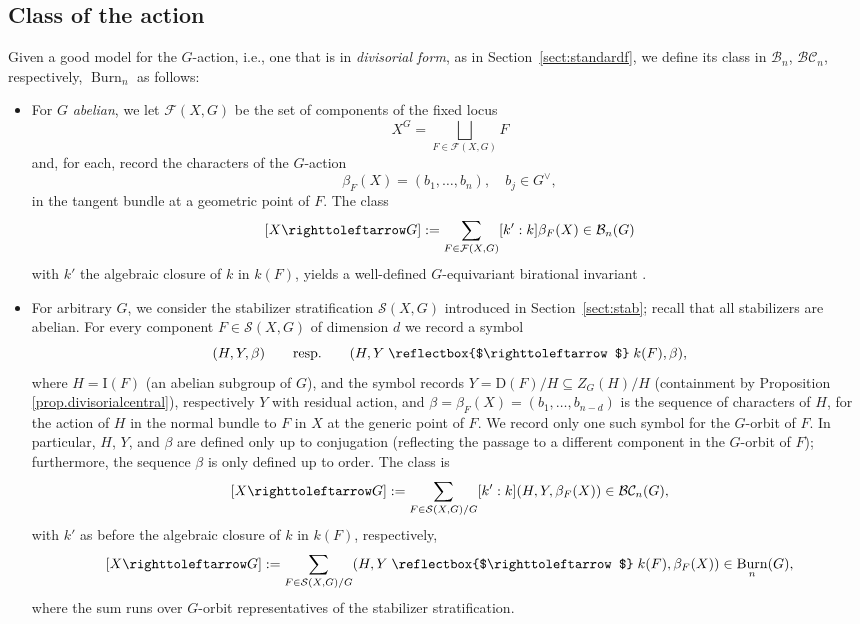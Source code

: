 \documentclass[12pt,reqno]{amsart}
\theoremstyle{plain}
\theoremstyle{remark}
\theoremstyle{definition}
\numberwithin{equation}{section}
\newcommand{\cB}{{\mathcal B}}
\newcommand{\cF}{{\mathcal F}}
\newcommand{\cS}{{\mathcal S}}
\newcommand{\BC}{{\mathcal B}{\mathcal C}}
\newcommand{\actsfromleft}{\mathrel{\reflectbox{$\righttoleftarrow$}}}
\newcommand{\actsfromright}{\righttoleftarrow}
\DeclareMathOperator{\Burn}{Burn}
\begin{document}
\subsection{Class of the action} 
\label{sect:class}
Given a good model for the $G$-action, i.e., one that is in \emph{divisorial form}, as in Section~\ref{sect:standardf}, we define its class in $\cB_n$, $\BC_n$, respectively, $\Burn_n$ as follows: 
\begin{itemize}
\item For $G$ {\em abelian}, we let $\cF(X,G)$ be the set of components of the fixed locus
\[ X^G=\bigsqcup_{F\in \cF(X,G)} F \]
and, for each, record the characters of the $G$-action 
$$
\beta_{F}(X)=(b_1,\ldots, b_n), \quad b_j\in G^\vee,
$$   
in the tangent bundle at a geometric point of $F$. The class 
\[
[X\actsfromright G]:=\sum_{F\in \cF(X,G)} [k':k]\beta_{F}(X)\in \cB_n(G)
\]
with $k'$ the algebraic closure of $k$ in $k(F)$,
yields a well-defined $G$-equivariant birational invariant \cite[Thm.\ 3]{KPT}.
\item 
For arbitrary $G$, we consider the stabilizer stratification $\cS(X,G)$ introduced in Section~\ref{sect:stab}; recall that all stabilizers are abelian.  
For every component $F\in \cS(X,G)$
of dimension $d$ we record a symbol
$$
(H, Y, \beta)\qquad\text{resp.}\qquad
(H, Y\actsfromleft k(F), \beta), 
$$
where $H=\mathrm{I}(F)$ (an abelian subgroup of $G$), and the symbol records
$Y=\mathrm{D}(F)/H\subseteq Z_G(H)/H$ (containment by Proposition \ref{prop.divisorialcentral}),
respectively $Y$ with residual action,
and
$\beta=\beta_F(X)=(b_1,\ldots, b_{n-d})$ is the sequence of characters of $H$, for the action of $H$ 
in the normal bundle to $F$ in $X$ at the generic point of $F$. We record only one such symbol for the $G$-orbit of $F$. In particular, $H$, $Y$, and $\beta$ are defined only up to conjugation (reflecting the passage to a different component in the $G$-orbit of $F$); furthermore, the sequence $\beta$ is only defined up to order.
The class is
$$
[X\actsfromright G] :=\sum_{F\in \cS(X,G)/G} [k':k](H, Y, \beta_F(X))\in\BC_n(G),
$$
with $k'$ as before the algebraic closure of $k$ in $k(F)$, respectively,
$$
[X\actsfromright G] :=\sum_{F\in \cS(X,G)/G}  (H, Y\actsfromleft k(F), \beta_F(X))\in\Burn_n(G),
$$
where the sum runs over $G$-orbit representatives of the stabilizer stratification.
\end{itemize}
\end{document}
